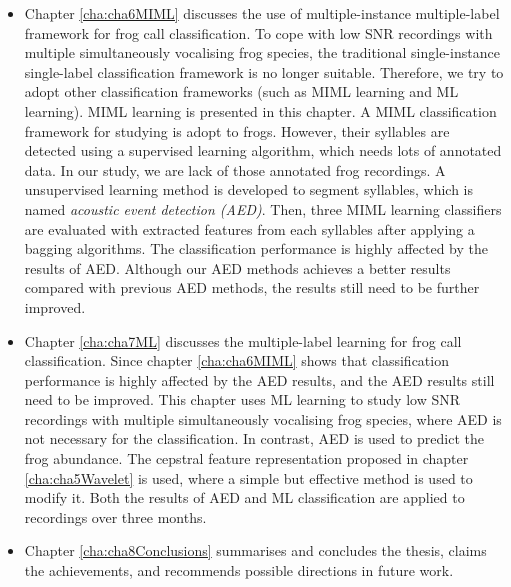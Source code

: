 \begin{itemize}
\item  Chapter \ref{cha:cha6MIML} discusses the use of multiple-instance multiple-label framework for frog call classification. To cope with low SNR recordings with multiple simultaneously vocalising frog species, the traditional single-instance single-label classification framework is no longer suitable. Therefore, we try to adopt other classification frameworks (such as MIML learning and ML learning). MIML learning is presented in this chapter. A MIML classification framework for studying is adopt to frogs. However, their syllables are detected using a supervised learning algorithm, which needs lots of annotated data. In our study, we are lack of those annotated frog recordings. A unsupervised learning method is developed to segment syllables, which is named \textit{acoustic event detection (AED)}. Then, three MIML learning classifiers are evaluated with extracted features from each syllables after applying a bagging algorithms. The classification performance is highly affected by the results of AED. Although our AED methods achieves a better results compared with previous AED methods, the results still need to be  further improved.


\item  Chapter \ref{cha:cha7ML} discusses the multiple-label learning for frog call classification. Since chapter \ref{cha:cha6MIML} shows that classification performance is highly affected by the AED results, and the AED results still need to be improved. This chapter uses ML learning to study low SNR recordings with multiple simultaneously vocalising frog species, where AED is not necessary for the classification. In contrast, AED is used to predict the frog abundance. The cepstral feature representation proposed in chapter \ref{cha:cha5Wavelet} is used, where a simple but effective method is used to modify it. Both the results of AED and ML classification are applied to recordings over three months. 



\item  Chapter \ref{cha:cha8Conclusions} summarises and concludes the thesis, claims the achievements, and recommends possible directions in future work.



\end{itemize}





